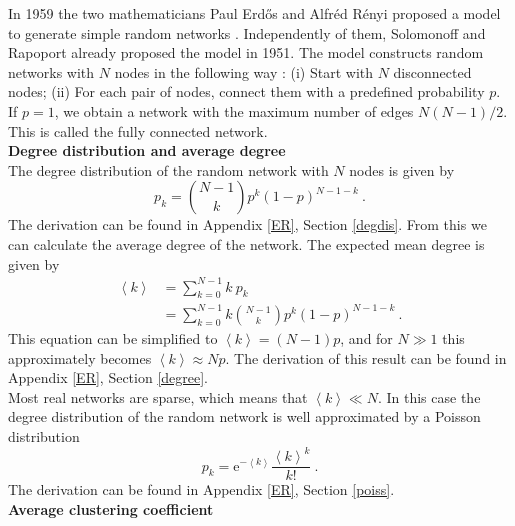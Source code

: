 \documentclass[11 pt , letterpaper , twoside , openright]{book}
\begin{document}
In 1959 the two mathematicians Paul Erd\H{o}s and Alfr\'{e}d R\'{e}nyi proposed a model to generate simple random networks \cite{F.Costa2007}. Independently of them, Solomonoff and Rapoport already proposed the model in 1951. The model constructs random networks with $N$ nodes in the following way \cite{Albert2002}: (i) Start with $N$ disconnected nodes; (ii) For each pair of nodes, connect them with a predefined probability $p$.\\
\newline
If $p=1$, we obtain a network with the maximum number of edges $N(N-1)/2$. This is called the fully connected network.\\
\newline
\textbf{Degree distribution and average degree}\\
\newline
The degree distribution of the random network with $N$ nodes is given by
\begin{equation}\label{degDistRan}
	p_k = \binom{N-1}{k}p^k (1-p)^{N-1-k} \ .
\end{equation}
The derivation can be found in Appendix \ref{ER}, Section \ref{degdis}. From this we can calculate the average degree of the network. The expected mean degree is given by \cite{Hopcroft2006}
\begin{equation}\label{avDeg}
\begin{split}
	\left<k\right> &= \sum_{k=0}^{N-1} k\  p_k  \\
&= \sum_{k=0}^{N-1} k \binom{N-1}{k}p^k (1-p)^{N-1-k} \ .
\end{split}
\end{equation}
This equation can be simplified to $\left<k\right> = (N-1)p$, and for $N \gg 1$ this approximately becomes $\left<k\right> \approx Np$. The derivation of this result can be found in Appendix \ref{ER}, Section \ref{degree}.\\
\newpage
\noindent
Most real networks are sparse, which means that $\left<k\right> \ll N$. In this case the degree distribution of the random network is well approximated by a Poisson distribution \cite{Albert2014} 
\begin{equation}
	p_k = \mathrm{e}^{-\left<k\right>} \frac{\left<k\right>^k}{k!} \ .
\end{equation}
The derivation can be found in Appendix \ref{ER}, Section \ref{poiss}. \\
\newline
\textbf{Average clustering coefficient}\\
\newline
\end{document}
